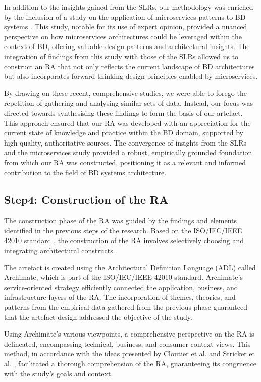 \documentclass{ieeeaccess}
\begin{document}
In addition to the insights gained from the SLRs, our methodology was enriched by the inclusion of a study on the application of microservices patterns to BD systems \cite{ataei2023application}. This study, notable for its use of expert opinion, provided a nuanced perspective on how microservices architectures could be leveraged within the context of BD, offering valuable design patterns and architectural insights. The integration of findings from this study with those of the SLRs allowed us to construct an RA that not only reflects the current landscape of BD architectures but also incorporates forward-thinking design principles enabled by microservices.

By drawing on these recent, comprehensive studies, we were able to forego the repetition of gathering and analysing similar sets of data. Instead, our focus was directed towards synthesising these findings to form the basis of our artefact. This approach ensured that our RA was developed with an appreciation for the current state of knowledge and practice within the BD domain, supported by high-quality, authoritative sources. The convergence of insights from the SLRs and the microservices study provided a robust, empirically grounded foundation from which our RA was constructed, positioning it as a relevant and informed contribution to the field of BD systems architecture.

\subsection{Step4: Construction of the RA}

The construction phase of the RA was guided by the findings and elements identified in the previous steps of the research. Based on the ISO/IEC/IEEE 42010 standard \cite{ISO42010}, the construction of the RA involves selectively choosing and integrating architectural constructs.

The artefact is created using the Architectural Definition Language (ADL) called Archimate, which is part of the ISO/IEC/IEEE 42010 standard. Archimate's service-oriented strategy efficiently connected the application, business, and infrastructure layers of the RA. The incorporation of themes, theories, and patterns from the empirical data gathered from the previous phase guaranteed that the artefact design addressed the objective of the study.

Using Archimate's various viewpoints, a comprehensive perspective on the RA is delineated, encompassing technical, business, and consumer context views. This method, in accordance with the ideas presented by Cloutier et al. \cite{Cloutier2010} and Stricker et al. \cite{stricker2010creating}, facilitated a thorough comprehension of the RA, guaranteeing its congruence with the study's goals and context.
\end{document}
